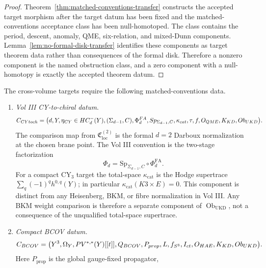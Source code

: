 \begin{proof}
  Theorem~\ref{thm:matched-conventions-transfer} constructs the accepted
  target morphism after the target datum has been fixed and the
  matched-conventions acceptance class has been null-homotoped.  The class
  contains the period, descent, anomaly, QME, six-relation, and
  mixed-Dunn components.  Lemma~\ref{lem:no-formal-disk-transfer}
  identifies these components as target theorem data rather than
  consequences of the formal disk.  Therefore a nonzero component is the
  named obstruction class, and a zero component with a null-homotopy is
  exactly the accepted theorem datum.
\end{proof}

\begin{defn}\label{defn:matched-conventions-templates}
  The cross-volume targets require the following matched-conventions data.
  \begin{enumerate}[label=(\roman*)]
    \item \emph{Vol III CY-to-chiral datum.}
      \[
      C_{CYto ch}=
      \bigl(d,Y,\eta_{CY}\in HC^-_d(Y),
      (\Sigma_{d-1},C),\Phi^{FA}_d,
	      Sp_{\Sigma_{d-1},C},\kappa_{cat},
      \tau,f,O_{QME},
      K_{KD},
      Ob_{UKD}\bigr).
      \]
      The comparison map from \(\mathfrak C_{\mathrm{loc}}^{(2)}\) is the
      formal \(d=2\) Darboux normalization at the chosen brane point.
      The Vol III convention is the two-stage factorization
      \[
        \Phi_d=\mathrm{Sp}_{\Sigma_{d-1},C}\circ\Phi^{\mathrm{FA}}_d .
      \]
	      For a compact CY\(_3\) target the total-space
	      \(\kappa_{\mathrm{cat}}\) is the Hodge supertrace
	      \(\sum_q(-1)^qh^{0,q}(Y)\); in particular
	      \(\kappa_{\mathrm{cat}}(K3\times E)=0\).  This component is
	      distinct from any Heisenberg, BKM, or fibre normalization in
	      Vol III.  Any BKM weight comparison is therefore a separate
	      component of
      \(\operatorname{Ob}_{\mathrm{UKD}}\), not a consequence of the
      unqualified total-space supertrace.
    \item \emph{Compact BCOV datum.}
      \[
      C_{BCOV}=
      \bigl(Y^3,\Omega_Y,PV^{*,*}(Y)[[t]],Q_{BCOV},
      P_{prop},L,f_{S^3},
      I_{ct},O_{HAE},
      K_{KD},
      Ob_{UKD}\bigr).
      \]
      Here \(P_{\mathrm{prop}}\) is the global gauge-fixed propagator,

\end{enumerate}
\end{defn}
